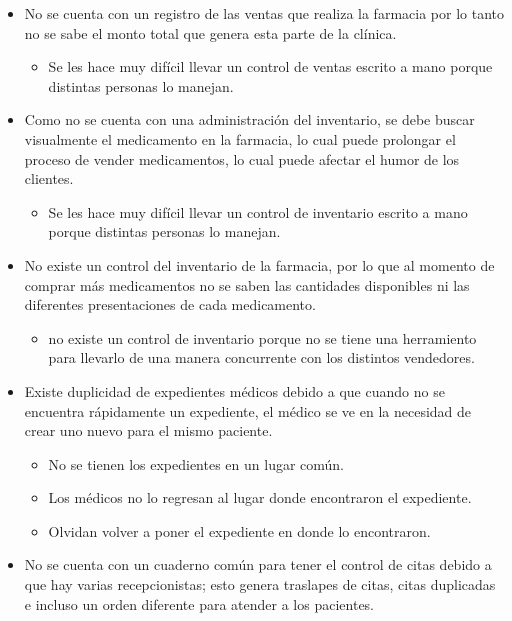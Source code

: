 \begin{itemize}
	\item No se cuenta con un registro de las ventas que realiza la farmacia por lo tanto no se sabe el monto total que genera esta parte de la clínica.
	\begin{itemize}
		\item Se les hace muy difícil llevar un control de ventas escrito a mano porque distintas personas lo manejan.
	\end{itemize}
    
    \item Como no se cuenta con una administración del inventario, se debe buscar visualmente el medicamento en la farmacia, lo cual puede prolongar el proceso de vender medicamentos, lo cual puede afectar el humor de los clientes.

	\begin{itemize}
		\item Se les hace muy difícil llevar un control de inventario escrito a mano porque distintas personas lo manejan.
	\end{itemize}
    
    \item No existe un control del inventario de la farmacia, por lo que al momento de comprar más medicamentos no se saben las cantidades disponibles ni las diferentes presentaciones de cada medicamento.

	\begin{itemize}
		\item no existe un control de inventario porque no se tiene una herramiento para llevarlo de una manera  concurrente con los distintos vendedores. 
	\end{itemize}
    
    \item Existe duplicidad de expedientes médicos debido a que cuando no se encuentra rápidamente un expediente, el médico se ve en la necesidad de crear uno nuevo para el mismo paciente. 
	\begin{itemize}
		\item No se tienen los expedientes en un lugar común.
        \item Los médicos no lo regresan al lugar donde encontraron el expediente.
		\item Olvidan volver a poner el expediente en donde lo encontraron.
	\end{itemize}
    
    \item No se cuenta con un  cuaderno común para tener el control de citas debido a que hay varias recepcionistas; esto genera traslapes de citas, citas duplicadas e incluso un orden diferente para atender a los pacientes.


\end{itemize}
